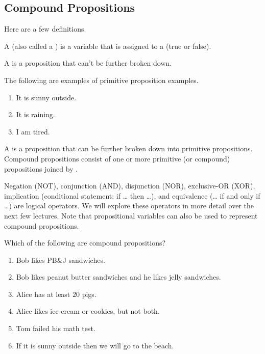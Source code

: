 \documentclass[../main.tex]{subfiles}
\begin{document}
\subsection{Compound Propositions}
Here are a few definitions.
\begin{definition}
    A  (also called a ) is a variable that is assigned to a  (true or false). 
\end{definition}
\begin{definition}
    A  is a proposition that can't be further broken down. 
\end{definition}
\begin{example}
    The following are examples of primitive proposition examples.
    \begin{enumerate}[label=(\alph*)]
        \item It is sunny outside.
        \item It is raining.
        \item I am tired.
    \end{enumerate}
\end{example}
\begin{definition}
    A  is a proposition that can be further broken down into primitive propositions. Compound propositions consist of one or more primitive (or compound) propositions joined by .
\end{definition}
Negation (NOT), conjunction (AND), disjunction (NOR), exclusive-OR (XOR), implication (conditional statement: if \ldots{} then \ldots), and equivalence (\ldots{} if and only if \ldots) are logical operators. We will explore these operators in more detail over the next few lectures. Note that propositional variables can also be used to represent compound propositions.
\begin{exercise}
Which of the following are compound propositions? 
    \begin{enumerate}[label=(\alph*)]
        \item Bob likes PB\&J sandwiches. 
        \item Bob likes peanut butter sandwiches and he likes jelly sandwiches.
        \item Alice has at least $20$ pigs.
        \item Alice likes ice-cream or cookies, but not both. 
        \item Tom failed his math test. 
        \item If it is sunny outside then we will go to the beach. 
    \end{enumerate}
\end{exercise}
\end{document}
